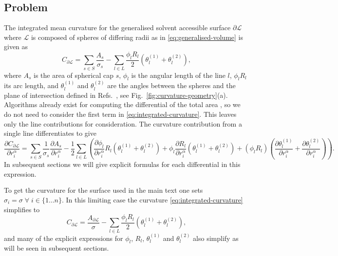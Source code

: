 \documentclass[11pt,twoside]{report}
\begin{document}
\subsection{Problem}

The integrated mean curvature for the generalised solvent accessible surface $\partial\mathcal{L}$ where $\mathcal{L}$ is composed of spheres of differing radii as in \eqref{eq:generalised-volume} is given as \cite{RothPRL2006}
\begin{equation}\label{eq:integrated-curvature}
  C_{\partial\mathcal{L}} =
  \sum_{s \in S} \frac{A_s}{\sigma_s} -
  \sum_{l \in L} \frac{\phi_l R_l}{2} (\theta_l^{(1)} + \theta_l^{(2)}),
\end{equation}
where $A_s$ is the area of spherical cap $s$, $\phi_l$ is the angular length of the line $l$, $\phi_l R_l$ its arc length, and $\theta_l^{(1)}$ and $\theta_l^{(2)}$ are the angles between the spheres and the plane of intersection defined in Refs.\ \cite{ConnollyJAC1983,ConnollyJACS1985}, see Fig.\ \ref{fig:curvature-geometry}(a).
Algorithms already exist for computing the differential of the total area \cite{BryantDCG2004,KleninJCC2011}, so we do not need to consider the first term in \eqref{eq:integrated-curvature}.
This leaves only the line contributions for consideration.
The curvature contribution from a single line differentiates to give
\begin{equation}\label{eq:line-curvature-differential}
  \frac{\partial C_{\partial\mathcal{L}}}{\partial r_i^\alpha} =
  \sum_{s \in S} \frac{1}{\sigma_s}
  \frac{\partial A_s}{\partial r_i^\alpha} -
  \frac{1}{2} \sum_{l \in L} \left(
  \frac{\partial \phi_l}{\partial r_i^\alpha} R_l (\theta_l^{(1)} + \theta_l^{(2)}) +
  \phi_l \frac{\partial R_l}{\partial r_i^\alpha} (\theta_l^{(1)} + \theta_l^{(2)}) +
  (\phi_l R_l) \left(
  \frac{\partial \theta_l^{(1)}}{\partial r_i^\alpha} +
  \frac{\partial \theta_l^{(2)}}{\partial r_i^\alpha}
  \right)
  \right).
\end{equation}
In subsequent sections we will give explicit formulas for each differential in this expression.


To get the curvature for the surface used in the main text one sets $\sigma_i = \sigma \; \forall \; i \in \{1 \dots n\}$.
In this limiting case the curvature \eqref{eq:integrated-curvature} simplifies to
\begin{equation*}
  C_{\partial\mathcal{L}} =
  \frac{A_{\partial\mathcal{L}}}{\sigma} -
  \sum_{l \in L} \frac{\phi_l R_l}{2} (\theta_l^{(1)} + \theta_l^{(2)}),
\end{equation*}
and many of the explicit expressions for $\phi_l$, $R_l$, $\theta_l^{(1)}$ and $\theta_l^{(2)}$ also simplify as will be seen in subsequent sections.
\end{document}
